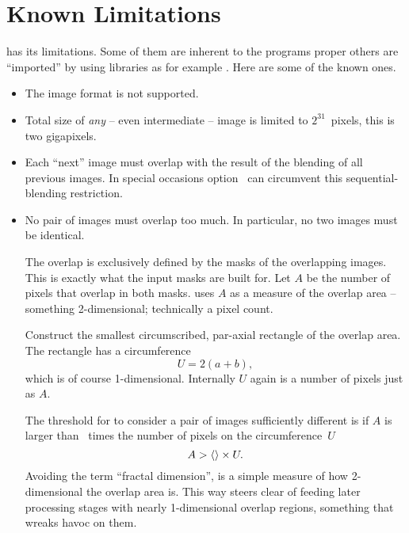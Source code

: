 

\chapter[Known Limitations]{\label{sec:known-limitations}%
  Known Limitations}

\App{} has its limitations.  Some of them are inherent to the programs proper others are
``imported'' by using libraries as for example .  Here are
some of the known ones.

\begin{itemize}
\item
  The  image format is not supported.

\item
  Total size of \emph{any} -- even intermediate -- image is limited to $2^{31}$~pixels, this is
  two gigapixels.

\ifenblend
\item
  Each ``next'' image must overlap with the result of the blending of all previous images.  In
  special occasions option~ can circumvent this sequential-blending
  restriction.

\item
  No pair of images must overlap too much.  In particular, no two images must be identical.

  \begin{geeknote}
    The overlap is exclusively defined by the masks of the overlapping images.  This is exactly
    what the input masks are built for.  Let $A$ be the number of pixels that overlap in both
    masks.  \App{} uses $A$ as a measure of the overlap area -- something 2\hyp dimensional;
    technically a pixel count.

    Construct the smallest circumscribed, par-axial rectangle of the overlap area.  The
    rectangle has a circumference
    \[
    U = 2 (a + b),
    \]
    which is of course 1-dimensional.  Internally $U$ again is a number of pixels just as $A$.

    The threshold for \App{} to consider a pair of images sufficiently different is if $A$ is
    larger than ~times the number of pixels on the
    circumference~$U$
    \begin{equation}\label{equ:overlap-threshold}
    A > \val{val:overlap-check-threshold} \times U.
    \end{equation}
    Avoiding the term ``fractal dimension'',  is a simple measure
    of how 2\hyp dimensional the overlap area is.  This way \App{} steers clear of feeding later
    processing stages with nearly 1\hyp dimensional overlap regions, something that wreaks havoc
    on them.
  \end{geeknote}


\end{itemize}
